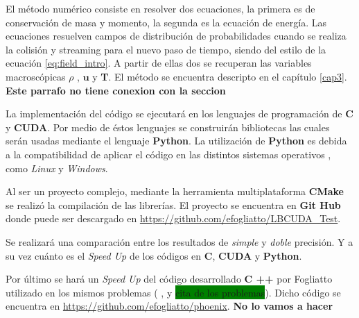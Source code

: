 El método numérico consiste en resolver dos ecuaciones, la primera es de conservación de masa y momento, la segunda es la ecuación de energía. Las ecuaciones resuelven campos de distribución de probabilidades cuando se realiza la colisión y streaming para el nuevo paso de tiempo, siendo del estilo de la ecuación \ref{eq:field_intro}. A partir de ellas dos se recuperan las variables macroscópicas $\rho$ , $\mathbf{u}$ y \textbf{T}. El método se encuentra descripto en el capítulo \ref{cap3}. \textbf{Este parrafo no tiene conexion con la seccion}

La implementación del código se ejecutará en los lenguajes de programación de \textbf{C} y \textbf{CUDA}. Por medio de éstos lenguajes se construirán bibliotecas las cuales serán usadas mediante el lenguaje \textbf{Python}. La utilización de \textbf{Python} es debida a la compatibilidad de aplicar  el código en las distintos sistemas operativos , como \textit{Linux} y \textit{Windows}.

Al ser un proyecto complejo, mediante la herramienta multiplataforma \textbf{CMake} se realizó la compilación de las librerías. El proyecto se encuentra en \textbf{Git Hub} donde puede ser descargado en \url{ https://github.com/efogliatto/LBCUDA_Test}.

Se realizará una comparación entre los resultados de \textit{simple} y \textit{doble} precisión. Y a su vez cuánto es el \textit{Speed Up} de los códigos en \textbf{C}, \textbf{CUDA} y \textbf{Python}. 

Por último se hará un \textit{Speed Up} del código desarrollado \textbf{C ++} por Fogliatto utilizado en los mismos problemas ( \cite{fogliatto2018modelado}, \cite{fogliatto2019simulation} y \colorbox{green}{cita de los problemas}). Dicho código se encuentra en \url{https://github.com/efogliatto/phoenix}. \textbf{No lo vamos a hacer}



